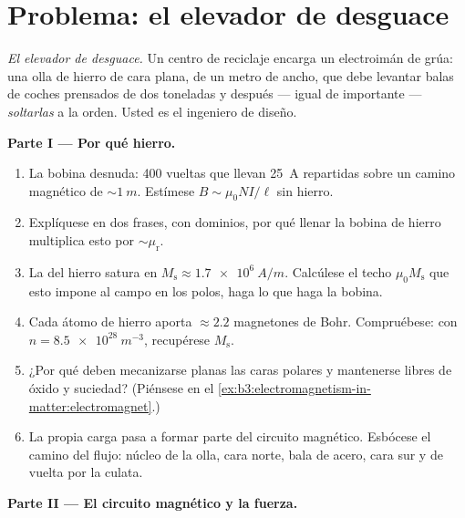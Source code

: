 \section{Problema: el elevador de desguace}

\begin{problem}\label{pb:b3:electromagnetism-in-matter:1}
\emph{El elevador de desguace.} Un centro de reciclaje encarga un
electroimán de grúa: una olla de hierro de cara plana, de un metro de ancho, que debe
levantar balas de coches prensados de dos toneladas y después --- igual de importante ---
\emph{soltarlas} a la orden. Usted es el ingeniero de diseño.

\medskip\noindent\textbf{Parte I --- Por qué hierro.}

\begin{enumerate}
  \item La bobina desnuda: 400 vueltas que llevan \qty{25}{A} repartidas sobre
        un camino magnético de $\sim\qty{1}{m}$. Estímese $B \sim
        \mu_0NI/\ell$ sin hierro.
  \item Explíquese en dos frases, con dominios, por qué llenar la
        bobina de hierro multiplica esto por $\sim\mu_{\text{r}}$.
  \item La  del hierro satura en $M_{\text{s}} \approx
        \qty{1.7e6}{A/m}$. Calcúlese el techo $\mu_0M_{\text{s}}$
        que esto impone al campo en los polos, haga lo que haga la bobina.
  \item Cada átomo de hierro aporta $\approx 2.2$ magnetones de Bohr.
        Compruébese: con $n = \qty{8.5e28}{m^{-3}}$, recupérese
        $M_{\text{s}}$.
  \item ¿Por qué deben mecanizarse planas las caras polares y mantenerse libres de
        óxido y suciedad? (Piénsese en el
        \cref{ex:b3:electromagnetism-in-matter:electromagnet}.)
  \item La propia carga pasa a formar parte del circuito magnético.
        Esbócese el camino del flujo: núcleo de la olla, cara norte, bala de acero,
        cara sur y de vuelta por la culata.
\end{enumerate}

\medskip\noindent\textbf{Parte II --- El circuito magnético y la fuerza.}


\end{problem}
